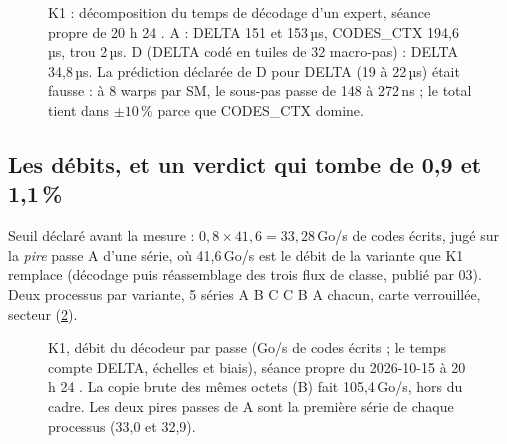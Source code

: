 \begin{figure}[!htbp]
\centering
\GrapheNoyDecomposition
\caption[K1 : décomposition du temps d'un expert]{K1 : décomposition du temps de décodage d'un expert, séance propre de 20 h 24 \mes. A : DELTA 151 et 153\,µs, CODES\_CTX 194,6\,µs, trou 2\,µs. D (DELTA codé en tuiles de 32 macro-pas) : DELTA 34,8\,µs. La prédiction déclarée de D pour DELTA (19 à 22\,µs) était fausse : à 8 warps par SM, le sous-pas passe de 148 à 272\,ns ; le total tient dans $\pm 10\,\%$ parce que CODES\_CTX domine.}
\label{fig:t2n-decomposition}
\end{figure}

\subsection{Les débits, et un verdict qui tombe de 0,9 et 1,1\,\%}

Seuil déclaré avant la mesure : $0{,}8 \times 41{,}6 = 33{,}28$\,Go/s de codes écrits, jugé sur la \emph{pire} passe A d'une série, où 41,6\,Go/s est le débit de la variante que K1 remplace (décodage puis réassemblage des trois flux de classe, publié par 03). Deux processus par variante, 5 séries A B C C B A chacun, carte verrouillée, secteur (\cref{fig:t2n-decodeur}).

\begin{figure}[!htbp]
\centering
\GrapheNoyDecodeur
\caption[K1 : débit du décodeur par passe]{K1, débit du décodeur par passe (Go/s de codes écrits ; le temps compte DELTA, échelles et biais), séance propre du 2026-10-15 à 20 h 24 \mes. La copie brute des mêmes octets (B) fait 105,4\,Go/s, hors du cadre. Les deux pires passes de A sont la première série de chaque processus (33,0 et 32,9).}
\label{fig:t2n-decodeur}
\end{figure}

